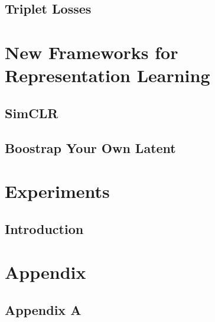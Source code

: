 \documentclass[oneside,openright,titlepage,numbers=noenddot,openany,headinclude,footinclude=true, cleardoublepage=empty,abstractoff,BCOR=5mm,paper=a4,fontsize=11pt, dvipsnames]{scrreprt}
\begin{document}
\chapter{Triplet Losses}

\clearpage

\part{New Frameworks for Representation Learning}
\chapter{SimCLR}

\chapter{Boostrap Your Own Latent}


\part{Experiments}
\chapter{Introduction}



\part{Appendix}
\chapter{Appendix A}




\nocite{*}


\end{document}
